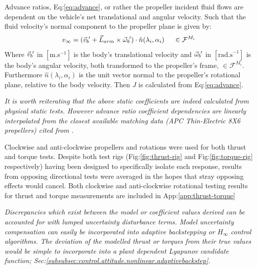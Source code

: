 \par
Advance ratios, Eq:\ref{eq:advance}, or rather the propeller incident fluid flows are dependent on the vehicle's net translational and angular velocity. Such that the fluid velocity's normal component to the propeller plane is given by:
\begin{equation}\label{eq:normal-fluid}
v_\infty = (\vec{v}_b\hspace{-1pt}' + \vec{L}_{arm}\times \vec{\omega}_b\hspace{-1pt}')\cdot \hat{n}(\lambda_i,\alpha_i)~~~~\in\mathcal{F}^{M_i}
\end{equation}
Where $\vec{v}_b\hspace{-1pt}'$ in $[\text{m.s}^{-1}]$ is the body's translational velocity and $\vec{\omega}_b\hspace{-1pt}'$ in $[\text{rad.s}^{-1}]$ is the body's angular velocity, both transformed to the propeller's frame, $\in\mathcal{F}^{M_i}$. Furthermore $\hat{n}(\lambda_i,\alpha_i)$ is the unit vector normal to the propeller's rotational plane, relative to the body velocity. Then $J$ is calculated from Eq:\ref{eq:advance}.
\par
{\color{Gray}\emph{It is worth reiterating that the above static coefficients are indeed calculated from physical static tests. However advance ratio coefficient dependencies are linearly interpolated from the closest available matching data (APC Thin-Electric 8X6 propellers) cited from \cite{UIUC}}.}
\par
Clockwise and anti-clockwise propellers and rotations were used for both thrust and torque tests. Despite both test rigs  (Fig:\ref{fig:thrust-rig} and Fig:\ref{fig:torque-rig} respectively) having been designed to specifically isolate each response, results from opposing directional tests were averaged in the hopes that stray opposing effects would cancel. Both clockwise and anti-clockwise rotational testing  results for thrust and torque measurements are included in App:\ref{app:thrust-torque}
\par
{\color{Gray}\emph{Discrepancies which exist between the model or coefficient values derived can be accounted for with lumped uncertainty disturbance terms. Model uncertainty compensation can easily be incorporated into adaptive backstepping or $H_\infty$ control algorithms. The deviation of the modelled thrust or torques from their true values would be simple to incorporate into a plant dependent Lyapunov candidate function; Sec:\ref{subsubsec:control.attitude.nonlinear.adaptivebackstep}.}}
